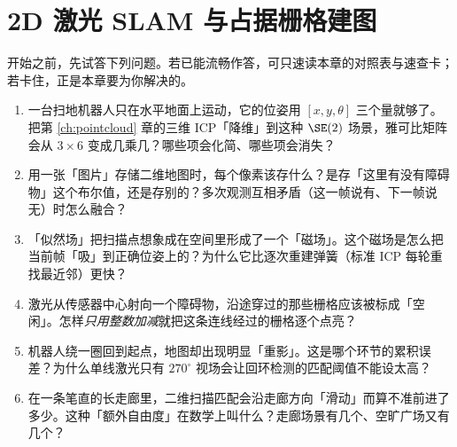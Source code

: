 \chapter{2D 激光 SLAM 与占据栅格建图}
\label{ch:slam2d}


\begin{practice}[前置自测]
开始之前，先试答下列问题。若已能流畅作答，可只速读本章的对照表与速查卡；若卡住，正是本章要为你解决的。
\begin{enumerate}
  \item 一台扫地机器人只在水平地面上运动，它的位姿用 $[x,y,\theta]$ 三个量就够了。把第 \cref{ch:pointcloud} 章的三维 ICP「降维」到这种 $\SE(2)$ 场景，雅可比矩阵会从 $3\times 6$ 变成几乘几？哪些项会化简、哪些项会消失？
  \item 用一张「图片」存储二维地图时，每个像素该存什么？是存「这里有没有障碍物」这个布尔值，还是存别的？多次观测互相矛盾（这一帧说有、下一帧说无）时怎么融合？
  \item 「似然场」把扫描点想象成在空间里形成了一个「磁场」。这个磁场是怎么把当前帧「吸」到正确位姿上的？为什么它比逐次重建弹簧（标准 ICP 每轮重找最近邻）更快？
  \item 激光从传感器中心射向一个障碍物，沿途穿过的那些栅格应该被标成「空闲」。怎样\emph{只用整数加减}就把这条连线经过的栅格逐个点亮？
  \item 机器人绕一圈回到起点，地图却出现明显「重影」。这是哪个环节的累积误差？为什么单线激光只有 $270^\circ$ 视场会让回环检测的匹配阈值不能设太高？
  \item 在一条笔直的长走廊里，二维扫描匹配会沿走廊方向「滑动」而算不准前进了多少。这种「额外自由度」在数学上叫什么？走廊场景有几个、空旷广场又有几个？
\end{enumerate}
\end{practice}

